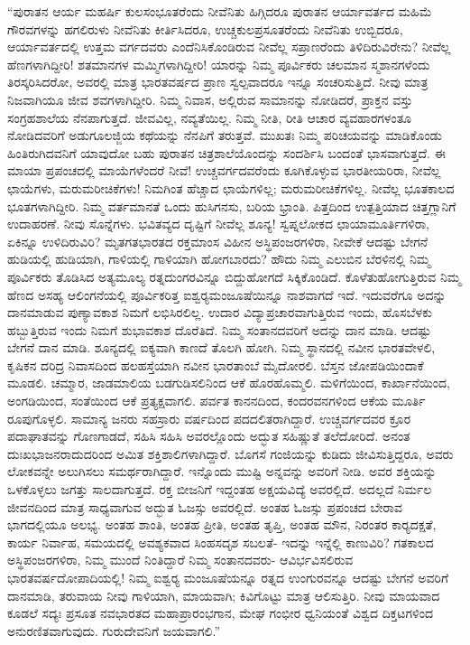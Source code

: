  “ಪುರಾತನ ಆರ್ಯ ಮಹರ್ಷಿ ಕುಲಸಂಭೂತರೆಂದು ನೀವೆನಿತು ಹಿಗ್ಗಿದರೂ ಪುರಾತನ ಆರ್ಯಾವರ್ತದ ಮಹಿಮೆ ಗೌರವಗಳನ್ನು ಹಗಲಿರುಳು ನೀವೆನಿತು ಕೀರ್ತಿಸಿದರೂ, ಉಚ್ಚಕುಲಪ್ರಸೂತರೆಂದು ನೀವೆನಿತು ಉಬ್ಬಿದರೂ, ಆರ್ಯಾವರ್ತದಲ್ಲಿ ಉತ್ತಮ ವರ್ಗದವರು ಎಂದೆನಿಸಿಕೊಂಡಿರುವ ನೀವೆಲ್ಲ ಸಪ್ರಾಣರೆಂದು ತಿಳಿದಿರುವಿರೇನು? ನೀವೆಲ್ಲ ಹೆಣಗಳಾಗಿದ್ದೀರಿ! ಶತಮಾನಗಳ ಮಮ್ಮಿಗಳಾಗಿದ್ದೀರಿ! ಯಾರನ್ನು ನಿಮ್ಮ ಪೂರ್ವಿಕರು ಚಲಮಾನ ಸ್ಮಶಾನಗಳೆಂದು ತಿರಸ್ಕರಿಸಿದರೋ, ಅವರಲ್ಲಿ ಮಾತ್ರ ಭಾರತವರ್ಷದ ಪ್ರಾಣ ಸ್ವಲ್ಪವಾದರೂ ಇನ್ನೂ ಸಂಚರಿಸುತ್ತಿದೆ. ನೀವು ಮಾತ್ರ ನಿಜವಾಗಿಯೂ ಜೀವ ಶವಗಳಾಗಿದ್ದೀರಿ. ನಿಮ್ಮ ನಿವಾಸ, ಅಲ್ಲಿರುವ ಸಾಮಾನನ್ನು ನೋಡಿದರೆ, ಪ್ರಾಕ್ತನ ವಸ್ತು ಸಂಗ್ರಹಶಾಲೆಯ ನೆನಪಾಗುತ್ತದೆ. ಜೀವವಿಲ್ಲ, ನವ್ಯತೆಯಿಲ್ಲ. ನಿಮ್ಮ ನೀತಿ, ರೀತಿ ಆಚಾರ ವ್ಯವಹಾರಗಳಂತೂ ನೋಡಿದವರಿಗೆ ಅಡುಗೂಲಜ್ಜಿಯ ಕಥೆಯನ್ನು ನೆನಪಿಗೆ ತರುತ್ತವೆ. ಮುಖತಃ ನಿಮ್ಮ ಪರಿಚಯವನ್ನು ಮಾಡಿಕೊಂಡು ಹಿಂತಿರುಗಿದವನಿಗೆ ಯಾವುದೋ ಬಹು ಪುರಾತನ ಚಿತ್ರಶಾಲೆಯೊಂದನ್ನು ಸಂದರ್ಶಿಸಿ ಬಂದಂತೆ ಭಾಸವಾಗುತ್ತದೆ. ಈ ಮಾಯಾ ಪ್ರಪಂಚದಲ್ಲಿ ಮಾಯೆಗಳೆಂದರೆ ನೀವೆ! ಉಚ್ಚವರ್ಗದವರೆಂದು ಕೂಗಿಕೊಳ್ಳುವ ಭಾರತೀಯರಿರಾ, ನೀವೆಲ್ಲ ಛಾಯೆಗಳು, ಮರುಮರೀಚಿಕೆಗಳು! ನಿಮಗಿಂತ ಹೆಚ್ಚಾದ ಛಾಯೆಗಳಿಲ್ಲ; ಮರುಮರೀಚಿಕೆಗಳಿಲ್ಲ. ನೀವೆಲ್ಲ ಭೂತಕಾಲದ ಭೂತಗಳಾಗಿದ್ದೀರಿ. ನಿಮ್ಮ ವರ್ತಮಾನತೆ ಒಂದು ಹುಸಿಗನಸು, ಬರಿಯ ಭ್ರಾಂತಿ. ಪಿತ್ತದಿಂದ ಉತ್ಪತ್ತಿಯಾದ ಚಿತ್ತಗ್ಲಾನಿಗೆ ಉದಾಹರಣೆ. ನೀವು ಸೊನ್ನೆಗಳು. ಭವಿತವ್ಯದ ದೃಷ್ಟಿಗೆ ನೀವೆಲ್ಲ ಶೂನ್ಯ! ಸ್ವಪ್ನಲೋಕದ ಛಾಯಾಮೂರ್ತಿಗಳಿರಾ, ಏಕಿನ್ನೂ ಉಳಿದಿರುವಿರಿ? ಮೃತಗತಭಾರತದ ರಕ್ತಮಾಂಸ ವಿಹೀನ ಅಸ್ಥಿಪಂಜರಗಳಿರಾ, ನೀವೇಕೆ ಆದಷ್ಟು ಬೇಗನೆ ಹುಡಿಯಲ್ಲಿ ಹುಡಿಯಾಗಿ, ಗಾಳಿಯಲ್ಲಿ ಗಾಳಿಯಾಗಿ ಹೋಗಬಾರದು? ಹೌದು ನಿಮ್ಮ ಎಲುಬಿನ ಬೆರಳಿನಲ್ಲಿ ನಿಮ್ಮ ಪೂರ್ವಿಕರು ತೊಡಿಸಿದ ಅತ್ಯಮೂಲ್ಯ ರತ್ನದುಂಗರವಿನ್ನೂ ಬಿದ್ದುಹೋಗದೆ ಸಿಕ್ಕಿಕೊಂಡಿದೆ. ಕೊಳೆತುಹೋಗುತ್ತಿರುವ ನಿಮ್ಮ ಹೆಣದ ಅಸಹ್ಯ ಆಲಿಂಗನೆಯಲ್ಲಿ ಪೂರ್ವಿಕರಿತ್ತ ಐಶ್ವರ‍್ಯಮಂಜೂಷೆಯಿನ್ನೂ ನಾಶವಾಗದೆ ಇದೆ. ಇದುವರೆಗೂ ಅದನ್ನು ದಾನಮಾಡುವ ಪುಣ್ಯಾವಕಾಶ ನಿಮಗೆ ಲಭಿಸಿರಲಿಲ್ಲ. ಉದಾರ ವಿದ್ಯಾಪ್ರಚಾರವಾಗುತ್ತಿರುವ ಇಂದು, ಹೊಸಬೆಳಕು ಹಬ್ಬುತ್ತಿರುವ ಇಂದು ನಿಮಗೆ ಶುಭಾವಕಾಶ ದೊರೆತಿದೆ. ನಿಮ್ಮ ಸಂತಾನದವರಿಗೆ ಅದನ್ನು ದಾನ ಮಾಡಿ. ಆದಷ್ಟು ಬೇಗನೆ ದಾನ ಮಾಡಿ. ಶೂನ್ಯದಲ್ಲಿ ಐಕ್ಯವಾಗಿ ಕಾಣದೆ ತೊಲಗಿ ಹೋಗಿ. ನಿಮ್ಮ ಸ್ಥಾನದಲ್ಲಿ ನವೀನ ಭಾರತವೇಳಲಿ, ಕೃಷಿಕನ ದರಿದ್ರ ನಿವಾಸದಿಂದ ಹಲಹಸ್ತೆಯಾಗಿ ನವೀನ ಭಾರತಾಂಬೆ ಮೈದೋರಲಿ. ಬೆಸ್ತನ ಜೋಪಡಿಯಿಂದಾಕೆ ಮೂಡಲಿ. ಚಮ್ಮಾರ, ಜಾಡಮಾಲಿಯ ಬಡಗುಡಿಸಲಿನಿಂದ ಆಕೆ ಹೊರಹೊಮ್ಮಲಿ. ಮಳಿಗೆಯಿಂದ, ಕಾರ್ಖಾನೆಯಿಂದ, ಅಂಗಡಿಯಿಂದ, ಸಂತೆಯಿಂದ ಆಕೆ ಪ್ರತ್ಯಕ್ಷವಾಗಲಿ. ಪರ್ವತ ಕಾನನದಿಂದ, ಕಂದರವನಗಳಿಂದ ಆಕೆಯ ಮೂರ್ತಿ ರೂಪುಗೊಳ್ಳಲಿ. ಸಾಮಾನ್ಯ ಜನರು ಸಹಸ್ರಾರು ವರ್ಷದಿಂದ ಪದದಲಿತರಾಗಿದ್ದಾರೆ. ಉಚ್ಚವರ್ಗದವರ ಕ್ರೂರ ಪದಾಘಾತವನ್ನು ಗೊಣಗಾಡದೆ, ಸಹಿಸಿ ಸಹಿಸಿ ಅವರಲ್ಲೊಂದು ಅದ್ಭುತ ಸಹಿಷ್ಣುತೆ ತಲೆದೋರಿದೆ. ಅನಂತ ದುಃಖಭಾಜನರಾದುದರಿಂದ ಅಮಿತ ಶಕ್ತಿಶಾಲಿಗಳಾಗಿದ್ದಾರೆ. ಬೊಗಸೆ ಗಂಜಿಯನ್ನು ಕುಡಿದು ಜೀವಿಸುತ್ತಿದ್ದರೂ, ಅವರು ಲೋಕವನ್ನೇ ಅಲುಗಿಸಲು ಸಮರ್ಥರಾಗಿದ್ದಾರೆ. ಇನ್ನೊಂದು ಮುಷ್ಟಿ ಅನ್ನವನ್ನು ಅವರಿಗೆ ನೀಡಿ. ಅವರ ಶಕ್ತಿಯನ್ನು ಒಳಕೊಳ್ಳಲು ಜಗತ್ತು ಸಾಲದಾಗುತ್ತದೆ. ರಕ್ತ ಬೀಜನಿಗೆ ಇದ್ದಂತಹ ಅಕ್ಷಯವಿದ್ಯೆ ಅವರಲ್ಲಿದೆ. ಅದಲ್ಲದೆ ನಿರ್ಮಲ ಜೀವನದಿಂದ ಮಾತ್ರ ಸಾಧ್ಯವಾಗುವ ಅದ್ಭುತ ಓಜಸ್ಸು ಅವರಲ್ಲಿದೆ. ಅಂತಹ ಓಜಸ್ಸು ಪ್ರಪಂಚದ ಬೇರಾವ ಭಾಗದಲ್ಲಿಯೂ ಅಲಭ್ಯ. ಅಂತಹ ಶಾಂತಿ, ಅಂತಹ ಪ್ರೀತಿ, ಅಂತಹ ತೃಪ್ತಿ, ಅಂತಹ ಮೌನ, ನಿರಂತರ ಕಾರ‍್ಯದಕ್ಷತೆ, ಕಾರ್ಯ ನಿರ್ವಾಹ, ಸಮಯದಲ್ಲಿ ಅವಶ್ಯಕವಾದ ಸಿಂಹಸದೃಶ ಸಬಲತೆ- ಇದನ್ನು ಇನ್ನೆಲ್ಲಿ ಕಾಣುವಿರಿ? ಗತಕಾಲದ ಅಸ್ಥಿಪಂಜರಗಳಿರಾ, ನಿಮ್ಮ ಮುಂದೆ ನಿಂತಿದ್ದಾರೆ ನಿಮ್ಮ ಸಂತಾನದವರು- ಆವಿರ್ಭವಿಸಲಿರುವ ಭಾರತವರ್ಷದೋಪಾದಿಯಲ್ಲಿ! ನಿಮ್ಮ ಐಶ್ವರ‍್ಯ ಮಂಜೂಷೆಯನ್ನೂ ರತ್ನದ ಉಂಗುರವನ್ನೂ ಆದಷ್ಟು ಬೇಗನೆ ಅವರಿಗೆ ದಾನಮಾಡಿ, ತರುವಾಯ ನೀವು ಗಾಳಿಯಾಗಿ, ಮಾಯವಾಗಿ; ಕಿವಿಗೊಟ್ಟು ಮಾತ್ರ ಆಲಿಸುತ್ತಿರಿ. ನೀವು ಮಾಯವಾದ ಕೂಡಲೆ ಸದ್ಯಃ ಪ್ರಸೂತ ನವಭಾರತದ ಮಹಾಪ್ರಾರಂಭಗಾನ, ಮೇಘ ಗಂಭೀರ ಧ್ವನಿಯಂತೆ ವಿಶ್ವದ ದಿಕ್ತಟಗಳಿಂದ ಅನುರಣಿತವಾಗುವುದು. ಗುರುದೇವನಿಗೆ ಜಯವಾಗಲಿ.” 

